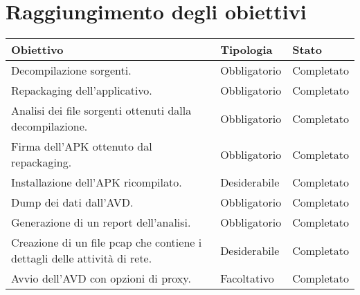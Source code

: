 

\section{Raggiungimento degli obiettivi}\label{sec:raggiungimento-degli-obiettivi}
\begin{longtable}{|C{7cm}|C{3cm}|C{3cm}|}
    \hline
    \textbf{Obiettivo} &
    \textbf{Tipologia} &
    \textbf{Stato} \\\hline
    Decompilazione sorgenti.
    & Obbligatorio & Completato \\\hline
    Repackaging dell'applicativo.
    & Obbligatorio & Completato \\\hline
    Analisi dei file sorgenti ottenuti dalla decompilazione.
    & Obbligatorio & Completato \\\hline
    Firma dell'APK ottenuto dal repackaging.
    & Obbligatorio & Completato \\\hline
    Installazione dell'APK ricompilato.
    & Desiderabile & Completato \\\hline
    Dump dei dati dall'AVD.
    & Obbligatorio & Completato \\\hline
    Generazione di un report dell'analisi.
    & Obbligatorio & Completato \\\hline
    Creazione di un file \gls{pcap} che contiene i dettagli delle attività di rete.
    & Desiderabile & Completato \\\hline
    Avvio dell'AVD con opzioni di proxy.
    & Facoltativo  & Completato \\\hline
\end{longtable}
